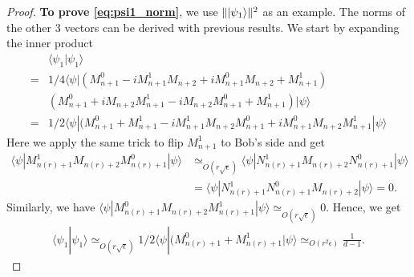 \documentclass[11pt,letterpaper]{article}
\newcommand{\ket}[1]{|#1\rangle}
\newcommand{\bra}[1]{\langle#1|}
\newcommand{\braket}[2]{\langle#1|#2\rangle}
\DeclarePairedDelimiter{\norm}{\lVert}{\rVert}
\newcommand{\1}{\mathbb{1}}
\newcommand{\nr}{n(r)}
\newcommand{\ep}{\epsilon}
\newcommand{\se}{\sqrt{\epsilon}}
\newcommand{\sd}{\sqrt{d}}
\newcommand{\appd}[1]{\simeq_{#1}}
\theoremstyle{definition}
\begin{document}
\begin{proof}
	\textbf{To prove \cref{eq:psi1_norm}}, we use $\norm{\ket{\psi_1}}^2$ as an example. 
	The norms of the other $3$ vectors can be derived with previous results.
	We start by expanding the inner product
	\begin{align*}
		&\braket{\psi_1}{\psi_1} \\
		=&1/4\bra{\psi}(M_{n+1}^0 - iM_{n+1}^1M_{n+2} + iM_{n+1}^0M_{n+2} +M_{n+1}^1)\\
		&(M_{n+1}^0 + iM_{n+2}M_{n+1}^1 -iM_{n+2}M_{n+1}^0 + M_{n+1}^1)\ket{\psi}\\
		=&1/2\bra{\psi}(M_{n+1}^0+M_{n+1}^1-iM_{n+1}^1M_{n+2}M_{n+1}^0+iM_{n+1}^0M_{n+2}M_{n+1}^1\ket{\psi}
	\end{align*}
	Here we apply the same trick to flip $M_{n+1}^1$ to Bob's side and get 
	\begin{align*}
		\bra{\psi}M_{\nr+1}^1M_{\nr+2}M_{\nr+1}^0\ket{\psi} 
		&\appd{O(r\se)} \bra{\psi}N_{\nr+1}^1M_{\nr+2}N_{\nr+1}^0\ket{\psi} \\
		&= \bra{\psi}N_{\nr+1}^1N_{\nr+1}^0M_{\nr+2}\ket{\psi} = 0.
	\end{align*}
	Similarly, we have $\bra{\psi}M_{\nr+1}^0M_{\nr+2}M_{\nr+1}^1\ket{\psi} \appd{ O(r\se)} 0$.
	Hence, we get 
	\begin{align}
		\braket{\psi_1}{\psi_1} \appd{O(r\se)} 1/2\bra{\psi}(M_{\nr+1}^0+M_{\nr+1}^1\ket{\psi} \appd{O(r^2\ep)} 
		 \frac{1}{d-1}.
	\end{align}
	

\end{proof}
\end{document}
